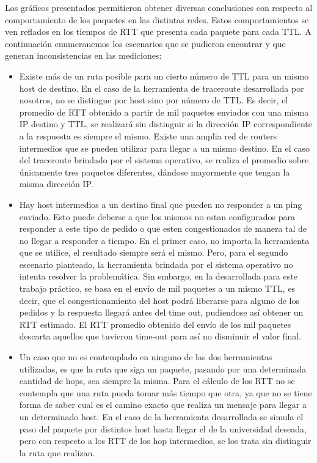 
Los gráficos presentados permitieron obtener diversas conclusiones con respecto al comportamiento de los paquetes en las distintas redes. Estos comportamientos se ven reflados en los tiempos de RTT que presenta cada paquete para cada TTL. A continuación enumeranemos los escenarios que se pudieron encontrar y que generan inconsistencias en las mediciones:
\begin{itemize}
\item Existe más de un ruta posible para un cierto número de TTL para un mismo host de destino. En el caso de la herramienta de traceroute desarrollada por nosotros, no se distingue por host sino por número de TTL. Es decir, el promedio de RTT obtenido a partir de mil paquetes enviados con una misma IP destino y TTL, se realizará sin distinguir si la dirección IP correspondiente a la respuesta es siempre el mismo. Existe una amplia red de routers intermedios que se pueden utilizar para llegar a un mismo destino. En el caso del traceroute brindado por el sistema operativo, se realiza el promedio sobre únicamente tres paquetes diferentes, dándose mayormente que tengan la misma dirección IP. 

\item Hay host intermedios a un destino final que pueden no responder a un ping enviado. Esto puede deberse a que los mismos no estan configurados para responder a este tipo de pedido o que esten congestionados de manera tal de no llegar a responder a tiempo. En el primer caso, no importa la herramienta que se utilice, el resultado siempre será el mismo. Pero, para el segundo escenario planteado, la herramienta brindada por el sistema operativo no intenta resolver la problemática. Sin embargo, en la desarrollada para este trabajo práctico, se basa en el envío de mil paquetes a un mismo TTL, es decir, que el congestionamiento del host podrá liberarse para alguno de los pedidos y la respuesta llegará antes del time out, pudiendose así obtener un RTT estimado. El RTT promedio obtenido del envío de los mil paquetes descarta aquellos que tuvieron time-out para así no disminuir el valor final.

\item Un caso que no es contemplado en ninguno de las dos herramientas utilizadas, es que la ruta que siga un paquete, pasando por una determinada cantidad de hops, sea siempre la misma. Para el cálculo de los RTT no se contempla que una ruta pueda tomar más tiempo que otra, ya que no se tiene forma de saber cual es el camino exacto que realiza un mensaje para llegar a un determinado host. En el caso de la herramienta desarrollada se simula el paso del paquete por distintos host hasta llegar el de la universidad deseada, pero con respecto a los RTT de los hop intermedios, se los trata sin distinguir la ruta que realizan. 


\end{itemize}




